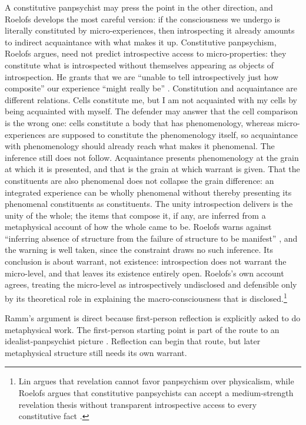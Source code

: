 A constitutive panpsychist may press the point in the other direction, and Roelofs develops the most careful version: if the consciousness we undergo is literally constituted by micro-experiences, then introspecting it already amounts to indirect acquaintance with what makes it up. Constitutive panpsychism, Roelofs argues, need not predict introspective access to micro-properties: they constitute what is introspected without themselves appearing as objects of introspection. He grants that we are ``unable to tell introspectively just how composite'' our experience ``might really be'' \citep[89]{roelofs2020revelation}. Constitution and acquaintance are different relations. Cells constitute me, but I am not acquainted with my cells by being acquainted with myself. The defender may answer that the cell comparison is the wrong one: cells constitute a body that has phenomenology, whereas micro-experiences are supposed to constitute the phenomenology itself, so acquaintance with phenomenology should already reach what makes it phenomenal. The inference still does not follow. Acquaintance presents phenomenology at the grain at which it is presented, and that is the grain at which warrant is given. That the constituents are also phenomenal does not collapse the grain difference: an integrated experience can be wholly phenomenal without thereby presenting its phenomenal constituents as constituents. The unity introspection delivers is the unity of the whole; the items that compose it, if any, are inferred from a metaphysical account of how the whole came to be. Roelofs warns against ``inferring absence of structure from the failure of structure to be manifest'' \citep[87]{roelofs2020revelation}, and the warning is well taken, since the constraint draws no such inference. Its conclusion is about warrant, not existence: introspection does not warrant the micro-level, and that leaves its existence entirely open. Roelofs's own account agrees, treating the micro-level as introspectively undisclosed and defensible only by its theoretical role in explaining the macro-consciousness that is disclosed.\footnote{Lin argues that revelation cannot favor panpsychism over physicalism, while Roelofs argues that constitutive panpsychists can accept a medium-strength revelation thesis without transparent introspective access to every constitutive fact \citep{lin2025,roelofs2020revelation}.}

Ramm's argument is direct because first-person reflection is explicitly asked to do metaphysical work. The first-person starting point is part of the route to an idealist-panpsychist picture \citep{ramm2021}. Reflection can begin that route, but later metaphysical structure still needs its own warrant.

